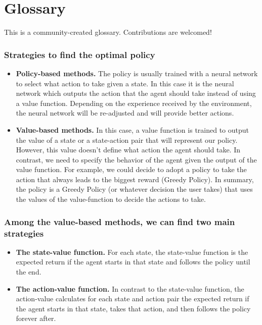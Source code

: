 \documentclass[11pt,a4paper]{article}
\begin{document}
\section{Glossary}\label{glossary}

This is a community-created glossary. Contributions are welcomed!

\subsubsection{Strategies to find the optimal policy}\label{strategies-to-find-the-optimal-policy}

\begin{itemize}
\tightlist
\item
  \textbf{Policy-based methods.} The policy is usually trained with a neural network to select what action to take given a state. In this case it is the neural network which outputs the action that the agent should take instead of using a value function. Depending on the experience received by the environment, the neural network will be re-adjusted and will provide better actions.
\item
  \textbf{Value-based methods.} In this case, a value function is trained to output the value of a state or a state-action pair that will represent our policy. However, this value doesn't define what action the agent should take. In contrast, we need to specify the behavior of the agent given the output of the value function. For example, we could decide to adopt a policy to take the action that always leads to the biggest reward (Greedy Policy). In summary, the policy is a Greedy Policy (or whatever decision the user takes) that uses the values of the value-function to decide the actions to take.
\end{itemize}

\subsubsection{Among the value-based methods, we can find two main strategies}\label{among-the-value-based-methods-we-can-find-two-main-strategies}

\begin{itemize}
\tightlist
\item
  \textbf{The state-value function.} For each state, the state-value function is the expected return if the agent starts in that state and follows the policy until the end.
\item
  \textbf{The action-value function.} In contrast to the state-value function, the action-value calculates for each state and action pair the expected return if the agent starts in that state, takes that action, and then follows the policy forever after.
\end{itemize}
\end{document}
